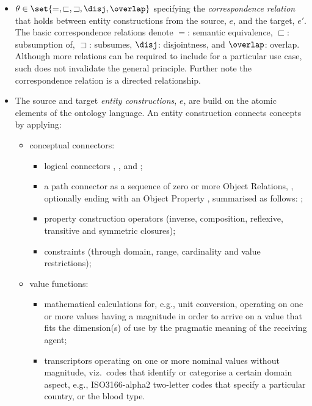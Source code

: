 \documentclass[sort&compress,preprint,authoryear,3p,twocolumn]{elsarticle}
\providecommand{\tightlist}{%
  \setlength{\itemsep}{0pt}\setlength{\parskip}{0pt}}
\begin{document}
\begin{itemize}
\tightlist
\item
  \(\theta \in \set{=, \sqsubset, \sqsupset, \disj, \overlap }\)
  specifying the \emph{correspondence relation} that holds between
  entity constructions from the source, \(e\), and the target, \(e'\).
  The basic correspondence relations denote \(=\): semantic equivalence,
  \(\sqsubset\): subsumption of, \(\sqsupset\): subsumes, \(\disj\):
  disjointness, and \(\overlap\): overlap. Although more relations can
  be required to include for a particular use case, such does not
  invalidate the general principle. Further note the correspondence
  relation is a directed relationship.
\item
  The source and target \emph{entity constructions}, \(e\), are build on
  the atomic elements of the ontology language. An entity construction
  connects concepts by applying:

  \begin{itemize}
  \tightlist
  \item
    conceptual connectors:

    \begin{itemize}
    \tightlist
    \item
      logical connectors , , and ;
    \item
      a path connector as a sequence of zero or more Object Relations,
      , optionally ending with an Object Property ,
      summarised as follows: ;
    \item
      property construction operators (inverse, composition, reflexive,
      transitive and symmetric closures);
    \item
      constraints (through domain, range, cardinality and value
      restrictions);
    \end{itemize}
  \item
    value functions:

    \begin{itemize}
    \tightlist
    \item
      mathematical calculations for, e.g., unit conversion, operating on
      one or more values having a magnitude in order to arrive on a
      value that fits the dimension(s) of use by the pragmatic meaning
      of the receiving agent;
    \item
      transcriptors operating on one or more nominal values without
      magnitude, viz.~codes that identify or categorise a certain domain
      aspect, e.g., ISO3166-alpha2 two-letter codes that specify a
      particular country, or the blood type.
    \end{itemize}
  \end{itemize}
\end{itemize}
\end{document}
